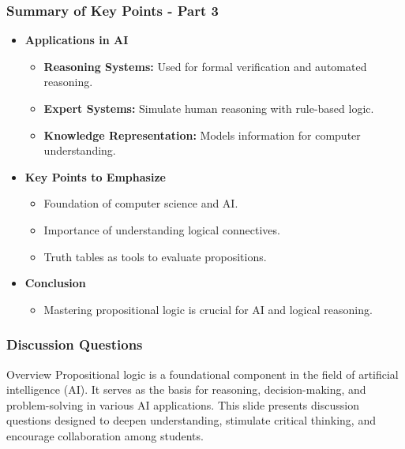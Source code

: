 \documentclass[aspectratio=169]{beamer}
\begin{document}
\begin{frame}[fragile]
  \frametitle{Summary of Key Points - Part 3}
  \begin{itemize}
      \item \textbf{Applications in AI}
      \begin{itemize}
          \item \textbf{Reasoning Systems:} Used for formal verification and automated reasoning.
          \item \textbf{Expert Systems:} Simulate human reasoning with rule-based logic.
          \item \textbf{Knowledge Representation:} Models information for computer understanding.
      \end{itemize}
  
      \item \textbf{Key Points to Emphasize}
      \begin{itemize}
          \item Foundation of computer science and AI.
          \item Importance of understanding logical connectives.
          \item Truth tables as tools to evaluate propositions.
      \end{itemize}
  
      \item \textbf{Conclusion}
      \begin{itemize}
          \item Mastering propositional logic is crucial for AI and logical reasoning.
      \end{itemize}
  \end{itemize}
\end{frame}

\begin{frame}[fragile]
    \frametitle{Discussion Questions}
    \begin{block}{Overview}
        Propositional logic is a foundational component in the field of artificial intelligence (AI). It serves as the basis for reasoning, decision-making, and problem-solving in various AI applications. This slide presents discussion questions designed to deepen understanding, stimulate critical thinking, and encourage collaboration among students.
    \end{block}
\end{frame}
\end{document}
